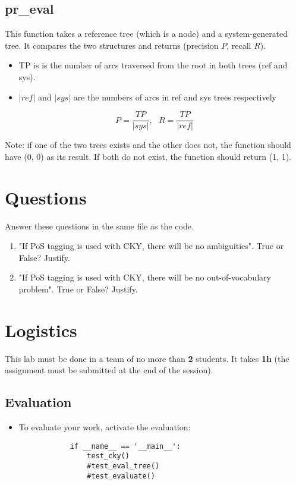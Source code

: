 \documentclass{../../../extra/aakpract/aakpract}
\begin{document}
\subsection{pr\_eval}

This function takes a reference tree (which is a node) and a system-generated tree.
It compares the two structures and returns (precision $P$, recall $R$).
\begin{itemize}
	\item TP is is the number of arcs traversed from the root in both trees (ref and sys).
	\item $|ref|$ and $|sys|$ are the numbers of arcs in ref and sys trees respectively
\end{itemize}

\[P = \frac{TP}{|sys|},\ \ \ R = \frac{TP}{|ref|}\]

Note: if one of the two trees exists and the other does not, the function should have (0, 0) as its result.
If both do not exist, the function should return (1, 1).


\section{Questions}

Answer these questions in the same file as the code.

\begin{enumerate}
	\item "If PoS tagging is used with CKY, there will be no ambiguities". True or False? Justify.
	\item "If PoS tagging is used with CKY, there will be no out-of-vocabulary problem". True or False? Justify.
\end{enumerate}

\section{Logistics}

This lab must be done in a team of no more than \textbf{2} students.
It takes \textbf{1h} (the assignment must be submitted at the end of the session).

\subsection{Evaluation}

\begin{itemize}
	\item To evaluate your work, activate the evaluation:
	\begin{small}
		\begin{verbatim}
			if __name__ == '__main__':
			    test_cky()
			    #test_eval_tree()
			    #test_evaluate()
		\end{verbatim}
	\end{small}\vspace{-1cm}
\end{itemize}
\end{document}
